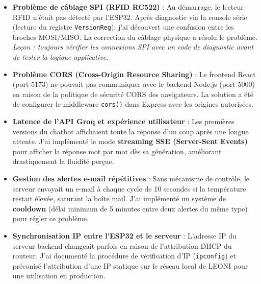 \documentclass[12pt,a4paper]{report}
\begin{document}
\begin{itemize}
    \item \textbf{Problème de câblage SPI (RFID RC522)} : Au démarrage, le lecteur RFID n'était pas détecté par l'ESP32. Après diagnostic via la console série (lecture du registre \texttt{VersionReg}), j'ai découvert une confusion entre les broches MOSI/MISO. La correction du câblage physique a résolu le problème. \textit{Leçon : toujours vérifier les connexions SPI avec un code de diagnostic avant de tester la logique applicative.}

    \item \textbf{Problème CORS (Cross-Origin Resource Sharing)} : Le frontend React (port 5173) ne pouvait pas communiquer avec le backend Node.js (port 5000) en raison de la politique de sécurité CORS des navigateurs. La solution a été de configurer le middleware \texttt{cors()} dans Express avec les origines autorisées.

    \item \textbf{Latence de l'API Groq et expérience utilisateur} : Les premières versions du chatbot affichaient toute la réponse d'un coup après une longue attente. J'ai implémenté le mode \textbf{streaming SSE (Server-Sent Events)} pour afficher la réponse mot par mot dès sa génération, améliorant drastiquement la fluidité perçue.

    \item \textbf{Gestion des alertes e-mail répétitives} : Sans mécanisme de contrôle, le serveur envoyait un e-mail à chaque cycle de 10 secondes si la température restait élevée, saturant la boîte mail. J'ai implémenté un système de \textbf{cooldown} (délai minimum de 5 minutes entre deux alertes du même type) pour régler ce problème.

    \item \textbf{Synchronisation IP entre l'ESP32 et le serveur} : L'adresse IP du serveur backend changeait parfois en raison de l'attribution DHCP du routeur. J'ai documenté la procédure de vérification d'IP (\texttt{ipconfig}) et préconisé l'attribution d'une IP statique sur le réseau local de LEONI pour une utilisation en production.
\end{itemize}
\end{document}
